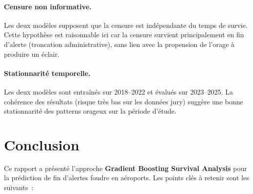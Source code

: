 \documentclass[a4paper,11pt]{article}
\begin{document}
\paragraph{Censure non informative.} Les deux modèles supposent que la censure est indépendante
du temps de survie. Cette hypothèse est raisonnable ici car la censure survient principalement
en fin d'alerte (troncation administrative), sans lien avec la propension de l'orage à produire
un éclair.

\paragraph{Stationnarité temporelle.} Les deux modèles sont entraînés sur 2018--2022 et évalués
sur 2023--2025. La cohérence des résultats (risque très bas sur les données jury) suggère une
bonne stationnarité des patterns orageux sur la période d'étude.

\section{Conclusion}

Ce rapport a présenté l'approche \textbf{Gradient Boosting Survival Analysis} pour la prédiction
de fin d'alertes foudre en aéroports. Les points clés à retenir sont les suivants~:

\medskip
\end{document}
